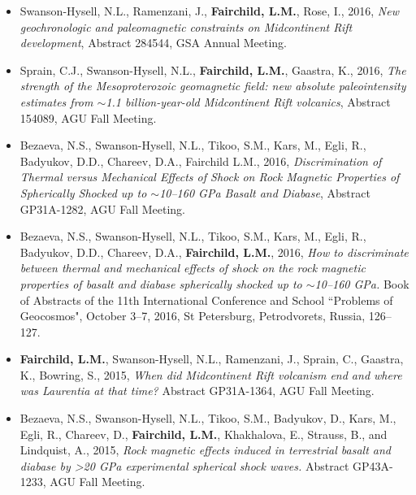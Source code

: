 \documentclass[11pt,a4paper,sans]{moderncv}        %
\begin{document}
\begin{itemize}
\vspace{3pt}

\item{Swanson-Hysell, N.L., Ramenzani, J., \textbf{Fairchild, L.M.}, Rose, I., 2016, \textit{New geochronologic and paleomagnetic constraints on Midcontinent Rift development}, Abstract 284544, GSA Annual Meeting.}

\vspace{3pt}

\item{Sprain, C.J., Swanson-Hysell, N.L., \textbf{Fairchild, L.M.}, Gaastra, K., 2016, \textit{The strength of the Mesoproterozoic geomagnetic field: new absolute paleointensity estimates from $\sim$1.1 billion-year-old Midcontinent Rift volcanics}, Abstract 154089, AGU Fall Meeting.}

\vspace{3pt}

\item{Bezaeva, N.S., Swanson-Hysell, N.L., Tikoo, S.M., Kars, M., Egli, R., Badyukov, D.D., Chareev, D.A., Fairchild L.M., 2016, \textit{Discrimination of Thermal versus Mechanical Effects of Shock on Rock Magnetic Properties of Spherically Shocked up to $\sim$10--160 GPa Basalt and Diabase}, Abstract GP31A-1282, AGU Fall Meeting.}

\vspace{3pt}

\item{Bezaeva, N.S., Swanson-Hysell, N.L., Tikoo, S.M., Kars, M., Egli, R., Badyukov, D.D., Chareev, D.A., \textbf{Fairchild, L.M.}, 2016, \textit{How to discriminate between thermal and mechanical effects of shock on the rock magnetic properties of basalt and diabase spherically shocked up to $\sim$10--160 GPa.} Book of Abstracts of the 11th International Conference and School ``Problems of Geocosmos", October 3--7, 2016, St Petersburg, Petrodvorets, Russia, 126--127.}

\vspace{3pt}

\item{\textbf{Fairchild, L.M.}, Swanson-Hysell, N.L., Ramenzani, J., Sprain, C., Gaastra, K., Bowring, S., 2015, \textit{When did Midcontinent Rift volcanism end and where was Laurentia at that time?} Abstract GP31A-1364, AGU Fall Meeting.}


\vspace{3pt}

\item{Bezaeva, N.S., Swanson-Hysell, N.L., Tikoo, S.M., Badyukov, D., Kars, M., Egli, R., Chareev, D., \textbf{Fairchild, L.M.}, Khakhalova, E., Strauss, B., and Lindquist, A., 2015, \textit{Rock magnetic effects induced in terrestrial basalt and diabase by >20 GPa experimental spherical shock waves.} Abstract GP43A-1233, AGU Fall Meeting.}


\end{itemize}
\end{document}
